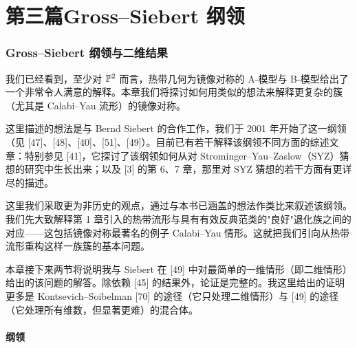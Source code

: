 \part{第三篇\quad Gross--Siebert 纲领}


\section{Gross--Siebert 纲领与二维结果}

我们已经看到，至少对 $\mathbb{P}^2$ 而言，热带几何为镜像对称的 A-模型与 B-模型给出了一个非常令人满意的解释。本章我们将探讨如何用类似的想法来解释更复杂的簇（尤其是 Calabi–Yau 流形）的镜像对称。

这里描述的想法是与 Bernd Siebert 的合作工作，我们于 2001 年开始了这一纲领（见 [47]、[48]、[40]、[51]、[49]）。目前已有若干解释该纲领不同方面的综述文章：特别参见 [41]，它探讨了该纲领如何从对 Strominger–Yau–Zaslow（SYZ）猜想的研究中生长出来；以及 [3] 的第 6、7 章，那里对 SYZ 猜想的若干方面有更详尽的描述。

这里我们采取更为非历史的观点，通过与本书已涵盖的想法作类比来叙述该纲领。我们先大致解释第 1 章引入的热带流形与具有有效反典范类的"良好"退化族之间的对应——这包括镜像对称最著名的例子 Calabi–Yau 情形。这就把我们引向从热带流形重构这样一族簇的基本问题。

本章接下来两节将说明我与 Siebert 在 [49] 中对最简单的一维情形（即二维情形）给出的该问题的解答。除依赖 [45] 的结果外，论证是完整的。我这里给出的证明更多是 Kontsevich–Soibelman [70] 的途径（它只处理二维情形）与 [49] 的途径（它处理所有维数，但显著更难）的混合体。


\subsection{纲领}

